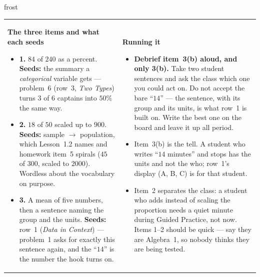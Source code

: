 \documentclass[10pt]{article}
\begin{document}
\begin{fixedskillbox}{frost}
\begin{tabularx}{\linewidth}{@{}X X@{}}
\begin{minipage}[t]{\linewidth}\vspace{0pt}
    \textbf{The three items and what each seeds}
    \begin{itemize}[leftmargin=1.1em, itemsep=1pt, topsep=2pt]
      \item \textbf{1.} $84$ of $240$ as a percent. \textbf{Seeds:} the summary a
            \emph{categorical} variable gets --- problem~6 (row~3, \emph{Two Types}) turns
            $3$ of $6$ captains into $50\%$ the same way.
      \item \textbf{2.} $18$ of $50$ scaled up to $900$. \textbf{Seeds:} sample $\to$
            population, which Lesson~1.2 names and homework item~5 spirals ($45$ of $300$,
            scaled to $2000$). Wordless about the vocabulary on purpose.
      \item \textbf{3.} A mean of five numbers, then a sentence naming the group and the
            units. \textbf{Seeds:} row~1 (\emph{Data in Context}) --- problem~1 asks for
            exactly this sentence again, and the ``$14$'' is the number the hook turns on.
    \end{itemize}
\end{minipage}
&
\begin{minipage}[t]{\linewidth}\vspace{0pt}
    \textbf{Running it}
    \begin{itemize}[leftmargin=1.1em, itemsep=1pt, topsep=2pt]
      \item \textbf{Debrief item~3(b) aloud, and only 3(b).} Take two student sentences and
            ask the class which one you could act on. Do not accept the bare ``$14$'' --- the
            sentence, with its group and its units, is what row~1 is built on. Write the best
            one on the board and leave it up all period.
      \item Item~3(b) is the tell. A student who writes ``$14$ minutes'' and stops has the
            units and not the who; row~1's display (A, B, C) is for that student.
      \item Item~2 separates the class: a student who adds instead of scaling the proportion
            needs a quiet minute during Guided Practice, not now. Items 1--2 should be quick
            --- say they are Algebra~1, so nobody thinks they are being tested.
    \end{itemize}
\end{minipage}
\end{tabularx}
\end{fixedskillbox}
\end{document}
